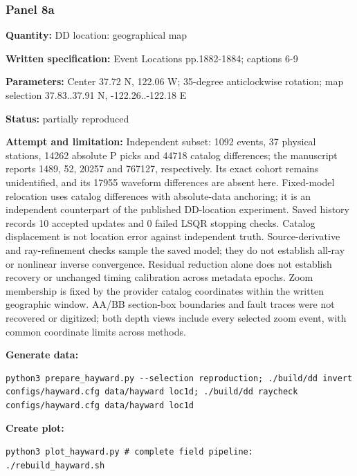 \subsubsection*{Panel 8a}
\noindent\textbf{Quantity:} DD location: geographical map\par
\noindent\textbf{Written specification:} Event Locations pp.1882-1884; captions 6-9\par
\noindent\textbf{Parameters:} Center 37.72 N, 122.06 W; 35-degree anticlockwise rotation; map selection 37.83..37.91 N, -122.26..-122.18 E\par
\noindent\textbf{Status:} partially reproduced\par
\noindent\textbf{Attempt and limitation:} Independent subset: 1092 events, 37 physical stations, 14262 absolute P picks and 44718 catalog differences; the manuscript reports 1489, 52, 20257 and 767127, respectively. Its exact cohort remains unidentified, and its 17955 waveform differences are absent here. Fixed-model relocation uses catalog differences with absolute-data anchoring; it is an independent counterpart of the published DD-location experiment. Saved history records 10 accepted updates and 0 failed LSQR stopping checks. Catalog displacement is not location error against independent truth. Source-derivative and ray-refinement checks sample the saved model; they do not establish all-ray or nonlinear inverse convergence. Residual reduction alone does not establish recovery or unchanged timing calibration across metadata epochs. Zoom membership is fixed by the provider catalog coordinates within the written geographic window. AA/BB section-box boundaries and fault traces were not recovered or digitized; both depth views include every selected zoom event, with common coordinate limits across methods.\par
\noindent\textbf{Generate data:}
\begin{lstlisting}
python3 prepare_hayward.py --selection reproduction; ./build/dd invert configs/hayward.cfg data/hayward loc1d; ./build/dd raycheck configs/hayward.cfg data/hayward loc1d
\end{lstlisting}
\noindent\textbf{Create plot:}
\begin{lstlisting}
python3 plot_hayward.py # complete field pipeline: ./rebuild_hayward.sh
\end{lstlisting}
